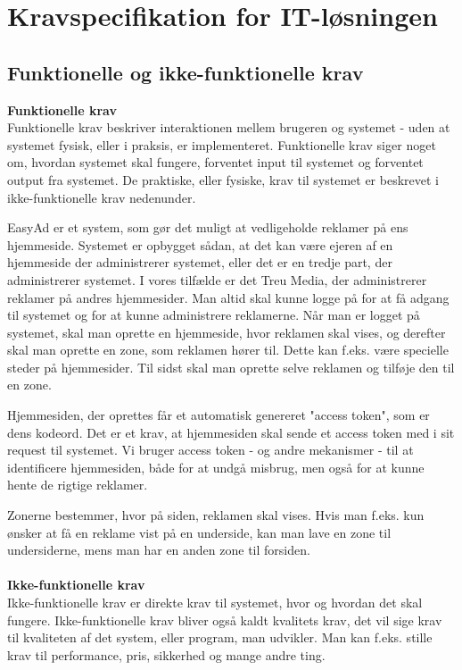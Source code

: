 \documentclass[a4paper,12pt]{article}
\begin{document}
\section{Kravspecifikation for IT-løsningen}
\subsection{Funktionelle og ikke-funktionelle krav}
\textbf{Funktionelle krav}
\\
Funktionelle krav beskriver interaktionen mellem brugeren og systemet - uden at systemet fysisk, eller i praksis, er implementeret. Funktionelle krav siger noget om, hvordan systemet skal fungere, forventet input til systemet og forventet output fra systemet. De praktiske, eller fysiske, krav til systemet er beskrevet i ikke-funktionelle krav nedenunder.

EasyAd er et system, som gør det muligt at vedligeholde reklamer på ens hjemmeside. Systemet er opbygget sådan, at det kan være ejeren af en hjemmeside der administrerer systemet, eller det er en tredje part, der administrerer systemet. I vores tilfælde er det Treu Media, der administrerer reklamer på andres hjemmesider. Man altid skal kunne logge på for at få adgang til systemet og for at kunne administrere reklamerne. Når man er logget på systemet, skal man oprette en hjemmeside, hvor reklamen skal vises, og derefter skal man oprette en zone, som reklamen hører til. Dette kan f.eks. være specielle steder på hjemmesider. Til sidst skal man oprette selve reklamen og tilføje den til en zone.

Hjemmesiden, der oprettes får et automatisk genereret "access token", som er dens kodeord. Det er et krav, at hjemmesiden skal sende et access token med i sit request til systemet. Vi bruger access token - og andre mekanismer - til at identificere hjemmesiden, både for at undgå misbrug, men også for at kunne hente de rigtige reklamer.

Zonerne bestemmer, hvor på siden, reklamen skal vises. Hvis man f.eks. kun ønsker at få en reklame vist på en underside, kan man lave en zone til undersiderne, mens man har en anden zone til forsiden.
\\
\\
\textbf{Ikke-funktionelle krav}
\\
Ikke-funktionelle krav er direkte krav til systemet, hvor og hvordan det skal fungere. Ikke-funktionelle krav bliver også kaldt kvalitets krav, det vil sige krav til kvaliteten af det system, eller program, man udvikler. Man kan f.eks. stille krav til performance, pris, sikkerhed og mange andre ting. 
\end{document}

